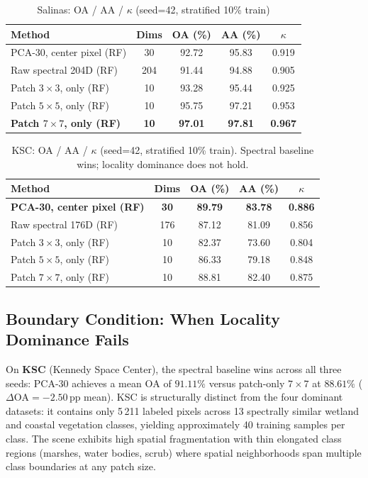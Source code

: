 \documentclass[journal]{IEEEtran}
\newcommand{\pp}{\,\text{pp}}
\newcommand{\OA}{\ensuremath{\mathrm{OA}}}
\begin{document}
\begin{table}[t]
\centering
\caption{Salinas: OA / AA / $\kappa$ (seed=42, stratified 10\% train)}
\label{tab:salinas}
\begin{tabular}{lcccc}
\toprule
Method & Dims & OA (\%) & AA (\%) & $\kappa$ \\
\midrule
PCA-30, center pixel (RF)    & 30  & 92.72 & 95.83 & 0.919 \\
Raw spectral 204D (RF)       & 204 & 91.44 & 94.88 & 0.905 \\
Patch $3{\times}3$, only (RF)& 10  & 93.28 & 95.44 & 0.925 \\
Patch $5{\times}5$, only (RF)& 10  & 95.75 & 97.21 & 0.953 \\
\textbf{Patch $7{\times}7$, only (RF)}
                             &\textbf{10}&\textbf{97.01}&\textbf{97.81}&\textbf{0.967}\\
\bottomrule
\end{tabular}
\end{table}

\begin{table}[t]
\centering
\caption{KSC: OA / AA / $\kappa$ (seed=42, stratified 10\% train).
         Spectral baseline wins; locality dominance does not hold.}
\label{tab:ksc}
\begin{tabular}{lcccc}
\toprule
Method & Dims & OA (\%) & AA (\%) & $\kappa$ \\
\midrule
\textbf{PCA-30, center pixel (RF)} &\textbf{30} &\textbf{89.79}&\textbf{83.78}&\textbf{0.886}\\
Raw spectral 176D (RF)       & 176 & 87.12 & 81.09 & 0.856 \\
Patch $3{\times}3$, only (RF)& 10  & 82.37 & 73.60 & 0.804 \\
Patch $5{\times}5$, only (RF)& 10  & 86.33 & 79.18 & 0.848 \\
Patch $7{\times}7$, only (RF)& 10  & 88.81 & 82.40 & 0.875 \\
\bottomrule
\end{tabular}
\end{table}

\subsection{Boundary Condition: When Locality Dominance Fails}

On \textbf{KSC} (Kennedy Space Center), the spectral baseline wins
across all three seeds: PCA-30 achieves a mean $\OA$ of $91.11\%$
versus patch-only $7{\times}7$ at $88.61\%$ ($\Delta\OA{=}-2.50\pp$
mean). KSC is structurally distinct from the four dominant datasets:
it contains only 5\,211 labeled pixels across 13 spectrally similar
wetland and coastal vegetation classes, yielding approximately 40
training samples per class. The scene exhibits high spatial
fragmentation with thin elongated class regions (marshes, water
bodies, scrub) where spatial neighborhoods span multiple class
boundaries at any patch size.
\end{document}
